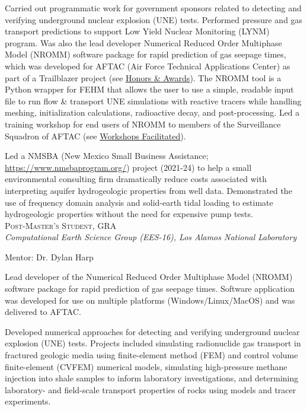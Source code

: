 \documentclass[11pt, letterpaper]{article}
\newcommand{\years}[1]{\marginnote{\scriptsize #1}}
\begin{document}
    Carried out programmatic work for government sponsors related to detecting
    and verifying underground nuclear explosion (UNE) tests. Performed pressure
    and gas transport predictions to support Low Yield Nuclear Monitoring
    (LYNM) program.  Was also the lead developer Numerical Reduced Order
    Multiphase Model (NROMM) software package for rapid prediction of gas
    seepage times, which was developed for AFTAC (Air Force Technical
    Applications Center) as part of a Trailblazer project (see
    \hyperref[sec:awards]{Honors \& Awards}). The NROMM tool is a Python
    wrapper for FEHM that allows the user to use a simple, readable input file
    to run flow \& transport UNE simulations with reactive tracers while
    handling meshing, initialization calculations, radioactive decay, and
    post-processing. Led a training workshop for end users of NROMM to members of
    the  Surveillance Squadron of AFTAC  (see
    \hyperref[sec:workshopsFacilitated]{Workshops Facilitated}). 

	Led a NMSBA (New Mexico Small Business Assistance;
	\href{https://www.nmsbaprogram.org/}{https://www.nmsbaprogram.org/})
	project (2021-24) to help a small environmental consulting firm dramatically reduce
	costs associated with interpreting aquifer hydrogeologic properties from
	well data.  Demonstrated the use of frequency domain analysis and
	solid-earth tidal loading to estimate hydrogeologic properties without the
	need for expensive pump tests. \\

\noindent
\years{2017 - 2019}\textsc{Post-Master's Student, GRA}\\
\textit{Computational Earth Science Group (EES-16), Los Alamos National Laboratory}

    \vspace{3pt} \noindent  
    Mentor: Dr. Dylan Harp

	Lead developer of the Numerical Reduced Order Multiphase Model (NROMM)
	software package for rapid prediction of gas seepage times. Software
	application was developed for use on multiple platforms
	(Windows/Linux/MacOS) and was delivered to AFTAC.

	Developed numerical approaches for detecting and verifying underground
	nuclear explosion (UNE) tests. Projects included simulating
	radionuclide gas transport in fractured geologic media using finite-element
	method (FEM) and control volume finite-element (CVFEM) numerical models,
	simulating high-pressure methane injection into shale samples to inform
	laboratory investigations, and determining laboratory- and field-scale
	transport properties of rocks using models and tracer experiments.
\end{document}
